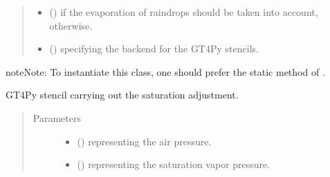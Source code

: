 \documentclass[letterpaper,10pt,english]{sphinxmanual}
\begin{document}
\begin{fulllineitems}
\begin{fulllineitems}
\begin{quote}
\begin{description}
\begin{itemize}
\item {} 
 () \textendash{}  if the evaporation of raindrops should be taken into account,  otherwise.

\item {} 
 () \textendash{}  specifying the backend for the GT4Py stencils.

\end{itemize}

\end{description}\end{quote}

\begin{sphinxadmonition}{note}{Note:}
To instantiate this class, one should prefer the static method
{\hyperref[\detokenize{api:tasmania.parameterizations.adjustments.AdjustmentMicrophysics.factory}]{}} of
{\hyperref[\detokenize{api:tasmania.parameterizations.adjustments.AdjustmentMicrophysics}]{}}.
\end{sphinxadmonition}

\end{fulllineitems}


\begin{fulllineitems}
\label{\detokenize{api:tasmania.parameterizations.adjustment_microphysics_kessler_wrf_saturation.AdjustmentMicrophysicsKesslerWRFSaturation._stencil_adjustment_defs}}
GT4Py stencil carrying out the saturation adjustment.
\begin{quote}\begin{description}
\item[{Parameters}] \leavevmode\begin{itemize}
\item {} 
 () \textendash{}  representing the air pressure.

\item {} 
 () \textendash{}  representing the saturation vapor pressure.


\end{itemize}
\end{description}
\end{quote}
\end{fulllineitems}
\end{fulllineitems}
\end{document}
